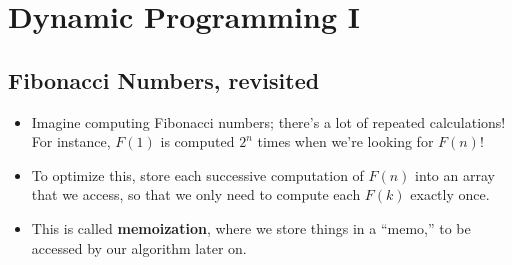 \section{Dynamic Programming I}

	\subsection{Fibonacci Numbers, revisited}
	\begin{itemize}
		\item Imagine computing Fibonacci numbers; there's a lot of repeated calculations! For instance, 
			$F(1)$ is computed $2^n$ times when we're looking for $F(n)$!
		\item To optimize this, store each successive computation of $F(n)$ into an array that we access, 
			so that we only need to compute each $F(k)$ exactly once.
		\item This is called \textbf{memoization}, where we store things in a ``memo,'' to be accessed by our 
			algorithm later on. 
	\end{itemize}

